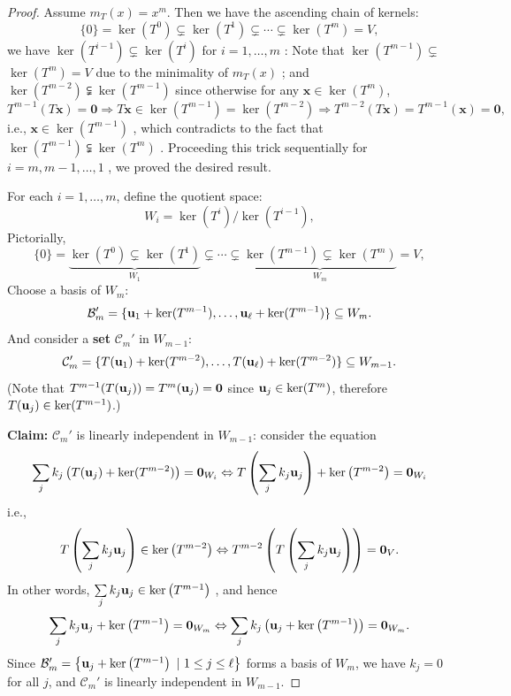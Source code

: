 \begin{proof}
Assume \( m_T(x) = x^m \). Then we have the ascending chain of kernels:
\[
\{0\} = \ker(T^0) \subsetneq \ker(T^1) \subsetneq \cdots \subsetneq \ker(T^m) = V,
\]
we have \(\ker \left( {T}^{i - 1}\right)  \subsetneq  \ker \left( {T}^{i}\right)\) for \(i = 1,\ldots ,m\) : Note that \(\ker \left( {T}^{m - 1}\right)  \subsetneq\)  \(\ker \left( {T}^{m}\right) = V\) due to the minimality of \({m}_{T}\left( x\right)\) ; and \(\ker \left( {T}^{m - 2}\right)  \subsetneqq  \ker \left( {T}^{m - 1}\right)\) since otherwise for any \(\mathbf{x} \in  \ker \left( {T}^{m}\right)\),
\[
{T}^{m - 1}\left( {T\mathbf{x}}\right)  = \mathbf{0} \Rightarrow  T\mathbf{x} \in  \ker \left( {T}^{m - 1}\right)  = \ker \left( {T}^{m - 2}\right)  \Rightarrow  {T}^{m - 2}\left( {T\mathbf{x}}\right)  = {T}^{m - 1}\left( \mathbf{x}\right)  = \mathbf{0},
\]
i.e., \(\mathbf{x} \in  \ker \left( {T}^{m - 1}\right)\) , which contradicts to the fact that \(\ker \left( {T}^{m - 1}\right)  \subsetneqq  \ker \left( {T}^{m}\right)\) . Proceeding this trick sequentially for \(i = m,m - 1,\ldots ,1\) , we proved the desired result.


For each \( i = 1, \ldots, m \), define the quotient space:
\[
W_i = \ker(T^i)/\ker(T^{i-1}),
\]
Pictorially, 
\[
\{0\} = \underbrace{\ker(T^0) \subsetneq \ker(T^1)}_{W_1} \subsetneq \cdots  \subsetneq \underbrace{\ker(T^{m-1}) \subsetneq \ker(T^m)}_{W_m} = V,
\]
Choose a basis of $W_m$:
\[
\mathcal{B}_m' = \{ {\bf u}_1 + \ker(T^{m-1}), \ldots, {\bf u}_{\ell} + \ker(T^{m-1}) \} \subseteq W_m.
\]
And consider a {\bf set} $\mathcal{C}_m'$ in $W_{m-1}$:
\[
\mathcal{C}_m' = \{ T({\bf u}_1) + \ker(T^{m-2}), \ldots, T({\bf u}_{\ell}) + \ker(T^{m-2}) \} \subseteq W_{m-1}.
\]
(Note that $T^{m-1}(T({\bf u}_j))=T^m({\bf u}_j)={\bf 0}$ since ${\bf u}_j\in\ker(T^m)$, therefore $T({\bf u}_j)\in\ker(T^{m-1})$.)

{\bf Claim:} \(\mathcal{C}_{m}'\) is linearly independent in $W_{m-1}$: consider the equation
\[
\mathop{\sum }\limits_{j}k_j\left( T({\bf u}_j) + \ker(T^{m-2})\right)  = {\mathbf{0}}_{{W}_{i}} \Leftrightarrow  T\left( {\mathop{\sum }\limits_{j}k_j{\bf u}_j}\right)  + \ker \left( {T}^{m - 2}\right)  = {\mathbf{0}}_{{W}_{i}}
\]
i.e.,
\[
T\left( {\mathop{\sum }\limits_{j}k_j{\bf u}_j}\right)  \in  \ker \left( {T}^{m - 2}\right)  \Leftrightarrow  {T}^{m-2}\left( T\left( {\mathop{\sum }\limits_{j}k_j{\bf u}_j}\right)\right)  = {\mathbf{0}}_{V}.
\]
In other words, ${\mathop{\sum }\limits_{j}k_j{\bf u}_j} \in  \ker \left( {T}^{m-1}\right)$ , and hence
\[
{\mathop{\sum }\limits_{j}k_j{\bf u}_j} + \ker \left( {T}^{m-1}\right)  = {\mathbf{0}}_{W_m} \Leftrightarrow  \mathop{\sum }\limits_{j}k_j\left( {{{\bf u}_j} + \ker \left( {T}^{m-1}\right) }\right)  = {\mathbf{0}}_{W_m}.
\]
Since \(\mathcal{B}_m' = \left\{ {\bf u}_j + \ker \left( {T}^{m-1}\right)\ |\ 1 \leq j \leq \ell\right\}\) forms a basis of \({W}_m\), we have \(k_j = 0\) for all \(j\), and $\mathcal{C}_m'$ is linearly independent in $W_{m-1}$. 


\end{proof}
